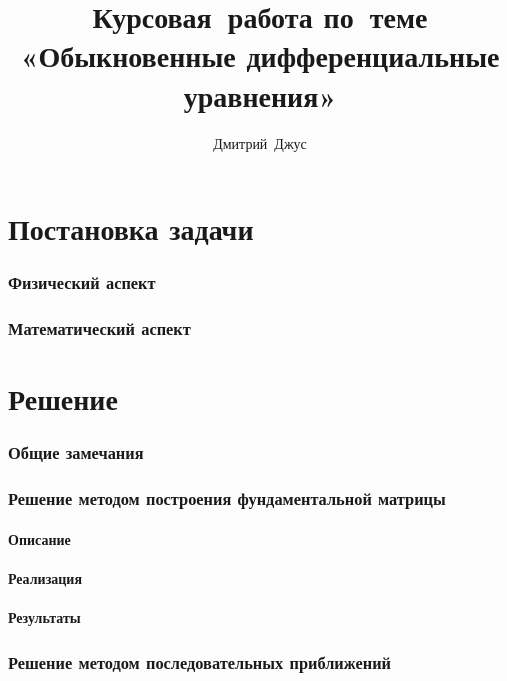 \documentclass{article}
\begin{document}
\author{Дмитрий Джус}
\title{Курсовая работа по теме «Обыкновенные дифференциальные уравнения»}
\maketitle

\newpage

\tableofcontents

\newpage
\part{Постановка задачи}

\section{Физический аспект}

\section{Математический аспект}

\newpage
\part{Решение}

\section{Общие замечания}

\section{Решение методом построения фундаментальной матрицы}

\subsection{Описание}

\subsection{Реализация}

\subsection{Результаты}

\section{Решение методом последовательных приближений}
\end{document}
